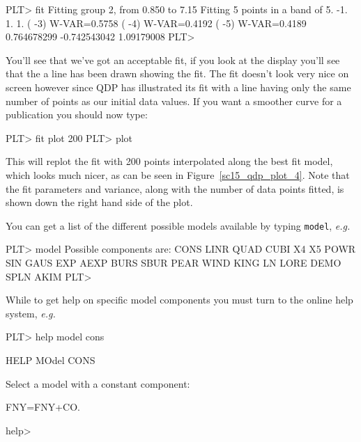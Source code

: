 \documentclass[twoside,11pt]{starlink}
\begin{document}
\begin{small}
\begin{terminalv}
PLT> fit
 Fitting group   2,  from  0.850     to   7.15
 Fitting      5 points in a band of      5.
 -1.  1.  1.
 ( -3)   W-VAR=0.5758
 ( -4)   W-VAR=0.4192
 ( -5)   W-VAR=0.4189
  0.764678299 -0.742543042  1.09179008
PLT>
\end{terminalv}
\end{small}

You'll see that we've got an acceptable fit, if you look at the
display you'll see that the a line has been drawn showing the fit. The
fit doesn't look very nice on screen however since QDP has illustrated
its fit with a line having only the same number of points as our
initial data values. If you want a smoother curve for a publication
you should now type:

\begin{small}
\begin{terminalv}
PLT> fit plot 200
PLT> plot
\end{terminalv}
\end{small}

This will replot the fit with 200 points interpolated along the best
fit model, which looks much nicer, as can be seen in
Figure~\ref{sc15_qdp_plot_4}. Note that the fit parameters and
variance, along with the number of data points fitted, is shown down
the right hand side of the plot.


You can get a list of the different possible models available by
typing \texttt{model}, \emph{e.g.\ }

\small
\begin{small}
\begin{terminalv}
PLT> model
 Possible components are:
  CONS  LINR  QUAD  CUBI  X4    X5    POWR  SIN   GAUS
  EXP   AEXP  BURS  SBUR  PEAR  WIND  KING  LN    LORE
  DEMO  SPLN  AKIM
PLT>
\end{terminalv}
\end{small}

While to get help on specific model components you must turn to the
online help system, \emph{e.g.\ }

\begin{small}
\begin{terminalv}
PLT> help model cons

     HELP
          MOdel
               CONS

Select a model with a constant component:

FNY=FNY+CO.

help>
\end{terminalv}
\end{small}
\end{document}
